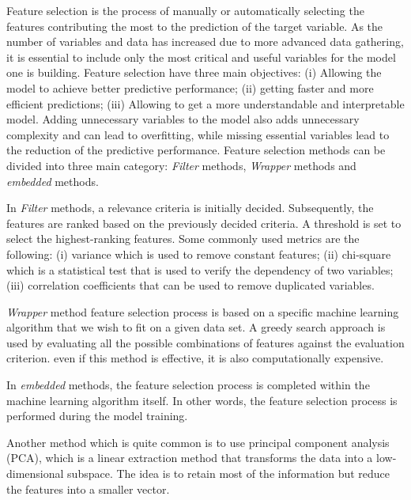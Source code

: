 \documentclass[LaM,binding=0.6cm, english]{sapthesis}
\begin{document}
Feature selection is the process of manually or automatically selecting the features contributing the most to the prediction of the target variable. As the number of variables and data has increased due to more advanced data gathering, it is essential to include only the most critical and useful variables for the model one is building. Feature selection have three main objectives: (i) Allowing the model to achieve better predictive performance; (ii) getting faster and more efficient predictions; (iii) Allowing to get a more understandable and interpretable model. Adding unnecessary variables to the model also adds unnecessary complexity and can lead to overfitting, while missing essential variables lead to the reduction of the predictive performance. Feature selection methods can be divided into three main category: \textit{Filter} methods, \textit{Wrapper} methods and \textit{embedded} methods.\cite{duboue2020}

\par In \textit{Filter} methods, a relevance criteria is initially decided. Subsequently, the features are ranked based on the previously decided criteria. A threshold is set to select the highest-ranking features. Some commonly used metrics are the following: (i) variance which is used to remove constant features; (ii) chi-square which is a statistical test that is used to verify the dependency of two variables; (iii) correlation coefficients that can be used to remove duplicated variables. 

\par \textit{Wrapper} method feature selection process is based on a specific machine learning algorithm that we wish to fit on a given data set. A greedy search approach is used by evaluating all the possible combinations of features against the evaluation criterion. even if this method is effective, it is also computationally expensive.

\par In \textit{embedded} methods, the feature selection process is completed within the machine learning algorithm itself. In other words, the feature selection process is performed during the model training.

\par Another method which is quite common is to use principal component analysis (PCA), which is a linear extraction method that transforms the data into a low-dimensional subspace. The idea is to retain most of the information but reduce the features into a smaller vector.\cite{Jolliffe2016}
\end{document}
